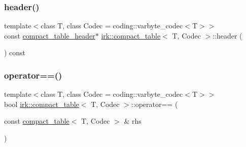 \mbox{\label{classirk_1_1compact__table_ac5b6d8b0f58abd180ebd0d57396aa7ac}} 
\subsubsection{\texorpdfstring{header()}{header()}}
{\footnotesize\ttfamily template$<$class T, class Codec = coding\+::varbyte\+\_\+codec$<$\+T$>$$>$ \\
const \mbox{\hyperlink{structirk_1_1compact__table__header}{compact\+\_\+table\+\_\+header}}$\ast$ \mbox{\hyperlink{classirk_1_1compact__table}{irk\+::compact\+\_\+table}}$<$ T, Codec $>$\+::header (\begin{DoxyParamCaption}{ }\end{DoxyParamCaption}) const\hspace{0.3cm}{\ttfamily [inline]}}

\mbox{\label{classirk_1_1compact__table_ae2947a995621e70e7e7c533e30a0e043}} 
\subsubsection{\texorpdfstring{operator==()}{operator==()}}
{\footnotesize\ttfamily template$<$class T, class Codec = coding\+::varbyte\+\_\+codec$<$\+T$>$$>$ \\
bool \mbox{\hyperlink{classirk_1_1compact__table}{irk\+::compact\+\_\+table}}$<$ T, Codec $>$\+::operator== (\begin{DoxyParamCaption}\item[{const \mbox{\hyperlink{classirk_1_1compact__table}{compact\+\_\+table}}$<$ T, Codec $>$ \&}]{rhs }\end{DoxyParamCaption})\hspace{0.3cm}{\ttfamily [inline]}}

\mbox{\label{classirk_1_1compact__table_a7b0ae00675c32fcc1e7804f1ad3ab3ad}} 
